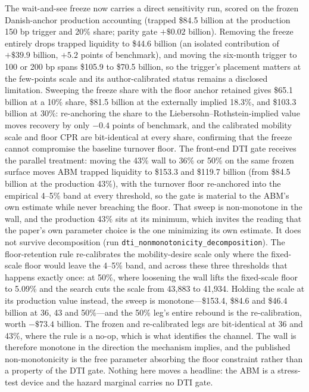 \documentclass[12pt]{article}
\begin{document}
The wait-and-see freeze now carries a direct sensitivity run, scored on the frozen Danish-anchor production accounting (trapped \$84.5 billion at the production 150 bp trigger and 20\% share; parity gate $+\$0.02$ billion). Removing the freeze entirely drops trapped liquidity to \$44.6 billion (an isolated contribution of $+\$39.9$ billion, $+5.2$ points of benchmark), and moving the six-month trigger to 100 or 200 bp spans \$105.9 to \$70.5 billion, so the trigger's placement matters at the few-points scale and its author-calibrated status remains a disclosed limitation. Sweeping the freeze share with the floor anchor retained gives \$65.1 billion at a 10\% share, \$81.5 billion at the externally implied 18.3\%, and \$103.3 billion at 30\%: re-anchoring the share to the Liebersohn--Rothstein-implied value moves recovery by only $-0.4$ points of benchmark, and the calibrated mobility scale and floor CPR are bit-identical at every share, confirming that the freeze cannot compromise the baseline turnover floor. The front-end DTI gate receives the parallel treatment: moving the 43\% wall to 36\% or 50\% on the same frozen surface moves ABM trapped liquidity to \$153.3 and \$119.7 billion (from \$84.5 billion at the production 43\%), with the turnover floor re-anchored into the empirical 4--5\% band at every threshold, so the gate is material to the ABM's own estimate while never breaching the floor. That sweep is non-monotone in the wall, and the production 43\% sits at its minimum, which invites the reading that the paper's own parameter choice is the one minimizing its own estimate. It does not survive decomposition (run \texttt{dti\_nonmonotonicity\_decomposition}). The floor-retention rule re-calibrates the mobility-desire scale only where the fixed-scale floor would leave the 4--5\% band, and across these three thresholds that happens exactly once: at 50\%, where loosening the wall lifts the fixed-scale floor to 5.09\% and the search cuts the scale from 43{,}883 to 41{,}934. Holding the scale at its production value instead, the sweep is monotone---\$153.4, \$84.6 and \$46.4 billion at 36, 43 and 50\%---and the 50\% leg's entire rebound is the re-calibration, worth $-\$73.4$ billion. The frozen and re-calibrated legs are bit-identical at 36 and 43\%, where the rule is a no-op, which is what identifies the channel. The wall is therefore monotone in the direction the mechanism implies, and the published non-monotonicity is the free parameter absorbing the floor constraint rather than a property of the DTI gate. Nothing here moves a headline: the ABM is a stress-test device and the hazard marginal carries no DTI gate.
\end{document}
